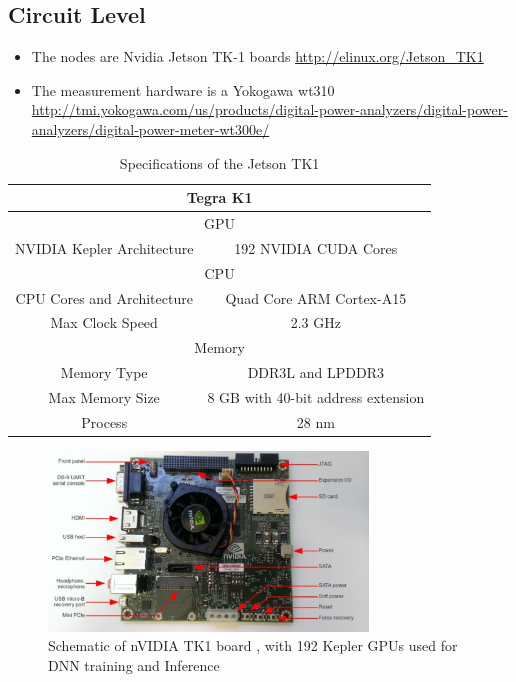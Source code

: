 \documentclass[letterpaper, 10 pt, conference]{ieeeconf}
\begin{document}
\subsection{Circuit Level}
\begin{itemize}
  \item The nodes are Nvidia Jetson TK-1 boards \url{http://elinux.org/Jetson_TK1}
  \item The measurement hardware is a Yokogawa  wt310 \url{http://tmi.yokogawa.com/us/products/digital-power-analyzers/digital-power-analyzers/digital-power-meter-wt300e/}
  \end{itemize}

  \begin{table}[h]
\centering
\caption{Specifications of the Jetson TK1}
\label{spec_table}
\begin{tabular}{|c|c|}
\hline
\multicolumn{2}{|c|}{Tegra K1}                                        \\ \hline
\multicolumn{2}{|c|}{GPU}                                                  \\ \hline
NVIDIA Kepler Architecture & 192 NVIDIA CUDA Cores                         \\ \hline
\multicolumn{2}{|c|}{CPU}                                                  \\ \hline
CPU Cores and Architecture & Quad Core ARM Cortex-A15 \\ \hline
Max Clock Speed            & 2.3 GHz                                       \\ \hline
\multicolumn{2}{|c|}{Memory}                                               \\ \hline
Memory Type                & DDR3L and LPDDR3                              \\ \hline
Max Memory Size            & 8 GB with 40-bit address extension            \\ \hline
Process                    & 28 nm                                         \\ \hline
\end{tabular}
\end{table}

          \begin{figure}[h]
              \centering
              \includegraphics[width=85mm,scale=1.1]{jetson}
              \caption{Schematic of nVIDIA TK1 board , with 192 Kepler GPUs used for DNN training and Inference}
              \label{fig:jetson}
          \end{figure}
\end{document}
